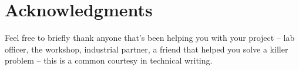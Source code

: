 \section*{Acknowledgments}

Feel free to briefly thank anyone that’s been helping you with your project – lab officer, the workshop, industrial partner, a friend that helped you solve a killer problem – this is a common courtesy in technical writing.

\pagebreak